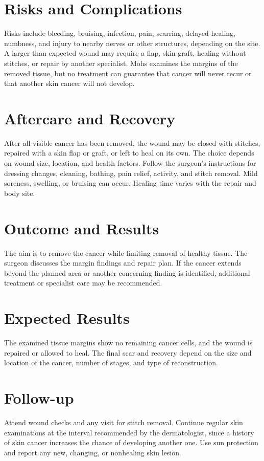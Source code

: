 \section*{Risks and Complications}
Risks include bleeding, bruising, infection, pain, scarring, delayed healing, numbness, and injury to nearby nerves or other structures, depending on the site. A larger-than-expected wound may require a flap, skin graft, healing without stitches, or repair by another specialist. Mohs examines the margins of the removed tissue, but no treatment can guarantee that cancer will never recur or that another skin cancer will not develop.

\section*{Aftercare and Recovery}
After all visible cancer has been removed, the wound may be closed with stitches, repaired with a skin flap or graft, or left to heal on its own. The choice depends on wound size, location, and health factors. Follow the surgeon's instructions for dressing changes, cleaning, bathing, pain relief, activity, and stitch removal. Mild soreness, swelling, or bruising can occur. Healing time varies with the repair and body site.

\section*{Outcome and Results}
The aim is to remove the cancer while limiting removal of healthy tissue. The surgeon discusses the margin findings and repair plan. If the cancer extends beyond the planned area or another concerning finding is identified, additional treatment or specialist care may be recommended.

\section*{Expected Results}
The examined tissue margins show no remaining cancer cells, and the wound is repaired or allowed to heal. The final scar and recovery depend on the size and location of the cancer, number of stages, and type of reconstruction.

\section*{Follow-up}
Attend wound checks and any visit for stitch removal. Continue regular skin examinations at the interval recommended by the dermatologist, since a history of skin cancer increases the chance of developing another one. Use sun protection and report any new, changing, or nonhealing skin lesion.

